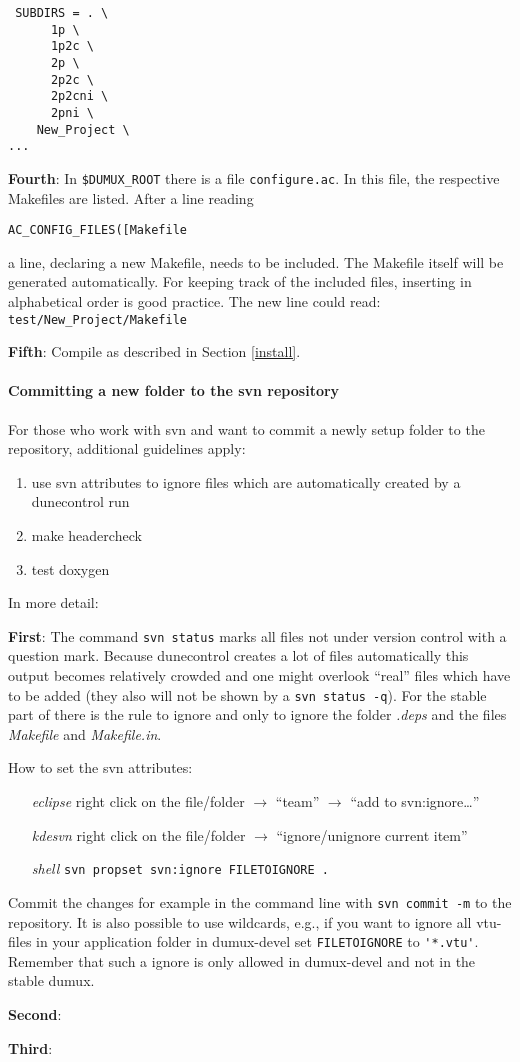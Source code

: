 \begin{verbatim}
 SUBDIRS = . \
	  1p \
	  1p2c \
	  2p \
	  2p2c \
	  2p2cni \
	  2pni \
	New_Project \
...
\end{verbatim}

\textbf{Fourth}: In \verb+$DUMUX_ROOT+ there is a file \verb+configure.ac+. In this file, the respective Makefiles are listed. After a line reading

 \verb+AC_CONFIG_FILES([Makefile+ 

 \noindent a line, declaring a new Makefile, needs to be included. The Makefile itself will be generated automatically. For keeping track of the included files, inserting in alphabetical order is good practice. The new line could read: \verb+test/New_Project/Makefile+ 

\textbf{Fifth}: Compile \Dumux as described in Section \ref{install}.

\paragraph{Committing a new folder to the svn repository}
For those who work with svn and want to commit a newly setup folder to the repository, additional guidelines apply:

\begin{enumerate}
 \item use svn attributes to ignore files which are automatically created by a dunecontrol run
 \item make headercheck
 \item test doxygen
\end{enumerate}

\noindent In more detail:

\textbf{First}: The command \verb+svn status+ marks all files not under version control with a question mark. Because dunecontrol creates a lot of files automatically this output becomes relatively crowded and one might overlook ``real'' files which have to be added (they also will not be shown by a \verb+svn status -q+).
For the stable part of \Dumux there is the rule to ignore and only to ignore the folder {\em .deps} and the files {\em Makefile} and {\em Makefile.in}.

How to set the svn attributes:
\begin{itemize}
 \item[{\em eclipse}] right click on the file/folder $\rightarrow$ ``team'' $\rightarrow$ ``add to svn:ignore\dots''
 \item[{\em kdesvn}] right click on the file/folder $\rightarrow$ ``ignore/unignore current item''
 \item[{\em shell}] \verb+svn propset svn:ignore FILETOIGNORE .+
\end{itemize}
Commit the changes for example in the command line with \verb+svn commit -m+ to the repository. It is also possible to use wildcards, e.g., if you want to ignore all vtu-files in your application folder in dumux-devel set \verb+FILETOIGNORE+ to \verb+'*.vtu'+. Remember that such a ignore is only allowed in dumux-devel and not in the stable dumux.



\textbf{Second}:

\textbf{Third}:
